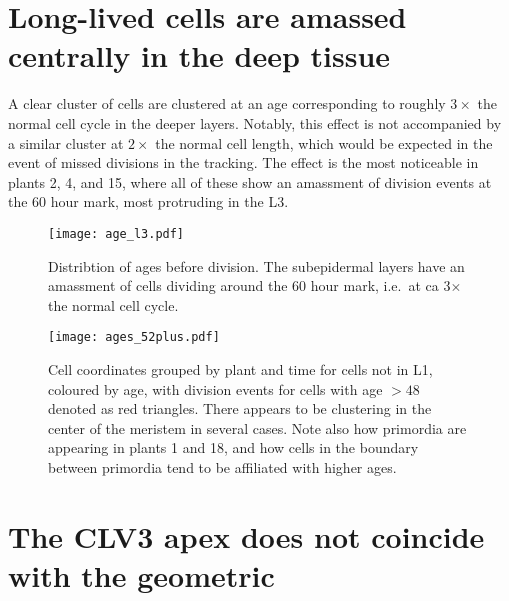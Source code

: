 \section{Long-lived cells are amassed centrally in the deep tissue}
A clear cluster of cells are clustered at an age corresponding to roughly
$3\times$ the normal cell cycle in the deeper layers. Notably, this effect is
not accompanied by a similar cluster at $2\times$ the normal cell length, which
would be expected in the event of missed divisions in the tracking. The effect
is the most noticeable in plants 2, 4, and 15, where all of these show an
amassment of division events at the 60 hour mark, most protruding in the L3. 

\begin{figure}[H]
  \centering
  \texttt{[image: age\_l3.pdf]}
  \caption[Layer-wise age distribution]{Distribtion of ages before division. The subepidermal layers have an
    amassment of cells dividing around the 60 hour mark, i.e.\ at ca 3$\times$
    the normal cell cycle.}
  \label{fig:age}
\end{figure}

\begin{figure}[H]
  \centering
  \texttt{[image: ages\_52plus.pdf]}
  \caption[Clustering of high-longevity cells]{Cell coordinates grouped by plant and time for cells not in L1, coloured by age, with division events for cells with
    age $>48$ denoted as red triangles. There appears to be clustering in the
    center of the meristem in several cases. Note also how primordia are appearing in plants 1
    and 18, and how cells in the boundary between primordia tend to be
    affiliated with higher ages.}
  \label{fig:ages}
\end{figure}

\section{The CLV3 apex does not coincide with the geometric}

